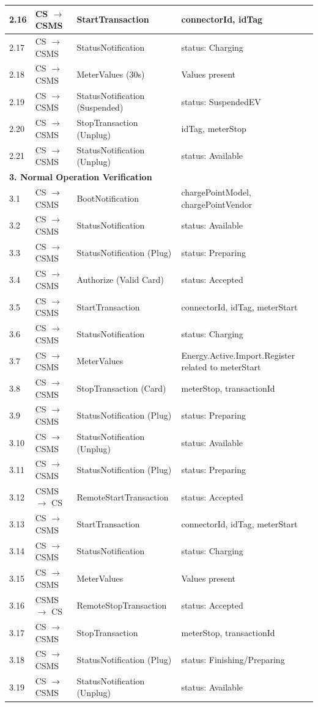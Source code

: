 \documentclass[a4paper,11pt]{report}
\begin{document}
\begin{footnotesize}
\begin{longtable}{|p{1.2cm}|p{2.5cm}|p{5.5cm}|p{6cm}|}
\hline
2.16 & CS $\to$ CSMS & StartTransaction & connectorId, idTag \\
\hline
2.17 & CS $\to$ CSMS & StatusNotification & status: Charging \\
\hline
2.18 & CS $\to$ CSMS & MeterValues (30s) & Values present \\
\hline
2.19 & CS $\to$ CSMS & StatusNotification (Suspended) & status: SuspendedEV \\
\hline
2.20 & CS $\to$ CSMS & StopTransaction (Unplug) & idTag, meterStop \\
\hline
2.21 & CS $\to$ CSMS & StatusNotification (Unplug) & status: Available \\
\hline

\multicolumn{4}{|l|}{\textbf{3. Normal Operation Verification}} \\
\hline
3.1 & CS $\to$ CSMS & BootNotification & chargePointModel, chargePointVendor \\
\hline
3.2 & CS $\to$ CSMS & StatusNotification & status: Available \\
\hline
3.3 & CS $\to$ CSMS & StatusNotification (Plug) & status: Preparing \\
\hline
3.4 & CS $\to$ CSMS & Authorize (Valid Card) & status: Accepted \\
\hline
3.5 & CS $\to$ CSMS & StartTransaction & connectorId, idTag, meterStart \\
\hline
3.6 & CS $\to$ CSMS & StatusNotification & status: Charging \\
\hline
3.7 & CS $\to$ CSMS & MeterValues & Energy.Active.Import.Register related to meterStart \\
\hline
3.8 & CS $\to$ CSMS & StopTransaction (Card) & meterStop, transactionId \\
\hline
3.9 & CS $\to$ CSMS & StatusNotification (Plug) & status: Preparing \\
\hline
3.10 & CS $\to$ CSMS & StatusNotification (Unplug) & status: Available \\
\hline
3.11 & CS $\to$ CSMS & StatusNotification (Plug) & status: Preparing \\
\hline
3.12 & CSMS $\to$ CS & RemoteStartTransaction & status: Accepted \\
\hline
3.13 & CS $\to$ CSMS & StartTransaction & connectorId, idTag, meterStart \\
\hline
3.14 & CS $\to$ CSMS & StatusNotification & status: Charging \\
\hline
3.15 & CS $\to$ CSMS & MeterValues & Values present \\
\hline
3.16 & CSMS $\to$ CS & RemoteStopTransaction & status: Accepted \\
\hline
3.17 & CS $\to$ CSMS & StopTransaction & meterStop, transactionId \\
\hline
3.18 & CS $\to$ CSMS & StatusNotification (Plug) & status: Finishing/Preparing \\
\hline
3.19 & CS $\to$ CSMS & StatusNotification (Unplug) & status: Available \\
\hline


\end{longtable}
\end{footnotesize}
\end{document}
